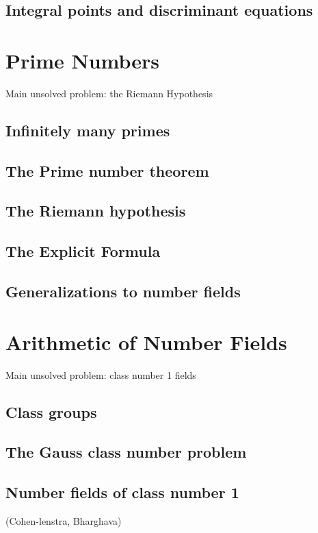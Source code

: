 \documentclass{book}
\begin{document}
\section{Integral points and discriminant equations}



\chapter{Prime Numbers}

Main unsolved problem: the Riemann Hypothesis



\section{Infinitely many primes}
\section{The Prime number theorem}
\section{The Riemann hypothesis}
\section{The Explicit Formula}
\section{Generalizations to number fields}


\chapter{Arithmetic of Number Fields}
Main unsolved problem: class number 1 fields

\section{Class groups}
\section{The Gauss class number problem}
\section{Number fields of class number 1}
 (Cohen-lenstra, Bharghava)
\end{document}

